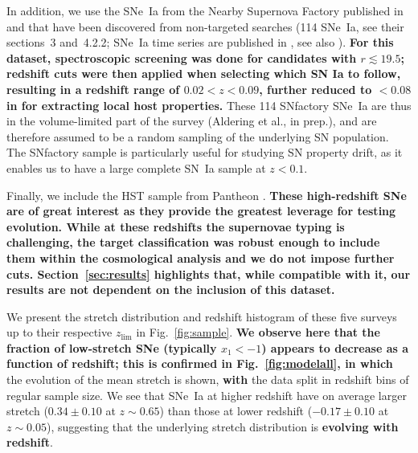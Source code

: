 \documentclass[]{aa}
\begin{document}
In addition, we use the SNe~Ia from the Nearby Supernova Factory
\citep[SNfactory,][]{aldering2002} published in \cite{rigault2020} and that have
been discovered from non-targeted searches (114 SNe~Ia, see their sections~3
and~4.2.2; SNe~Ia time series are published in \citealt{saunders2020}, see also
\citealt{aldering2020}). \textbf{For this dataset, spectroscopic screening was
    done for candidates with $r \lesssim 19.5$; redshift cuts were then applied
    when selecting which SN Ia to follow, resulting in a redshift range of $0.02
< z < 0.09$, further reduced to $<0.08$ in \cite{rigault2020} for extracting
local host properties.} These 114 SNfactory SNe~Ia are thus in the
volume-limited part of the survey (Aldering et al., in prep.), and are therefore
assumed to be a random sampling of the underlying SN population. The SNfactory
sample is particularly useful for studying SN property drift, as it enables us
to have a large complete SN~Ia sample at $z<0.1$. 

Finally, we include the HST sample from Pantheon \citep{strolger04}.
\textbf{These high-redshift SNe are of great interest as they provide the
    greatest leverage for testing evolution. While at these redshifts the
    supernovae typing is challenging, the target classification was robust
    enough to include them within the cosmological analysis \citep{scolnic2018a}
    and we do not impose further cuts. Section~\ref{sec:results} highlights
    that, while compatible with it, our results are not dependent on the
    inclusion of this dataset.}

We present the stretch distribution and redshift histogram of these five surveys
up to their respective $z_{\lim}$ in Fig.~\ref{fig:sample}. \textbf{We observe here
that the fraction of low-stretch SNe (typically $x_1 < -1$) appears to decrease as
a function of redshift; this is confirmed in Fig.~\ref{fig:modelall}, in which}
the evolution of the mean stretch is shown, \textbf{with} the data split in
redshift bins of regular sample size. We see that SNe~Ia at higher redshift have
on average larger stretch ($0.34 \pm 0.10$ at $z\sim0.65$) than those at lower
redshift ($-0.17\pm 0.10$ at $z\sim0.05$), suggesting that the underlying
stretch distribution is \textbf{evolving with redshift}.
\end{document}

